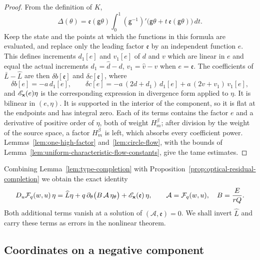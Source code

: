 \begin{proof}
From the definition of $K$,
\[
 \Delta(\theta)=\mathfrak e(\mathsf g\theta)
 \int_0^1(\mathsf g^{-1})'\bigl(\mathsf g\theta
          +t\,\mathfrak e(\mathsf g\theta)\bigr)\,dt .
\]
Keep the state and the points at which the functions in this formula
are evaluated, and replace only the leading factor $\mathfrak e$ by an
independent function $e$. This defines increments $d_1[e]$ and
$v_1[e]$ of $d$ and $v$ which are linear in $e$ and equal the actual
increments $d_1=\widehat d-d$, $v_1=\widehat v-v$ when
$e=\mathfrak e$. The coefficients of $\bar L-\widehat L$ are then
$\delta b[\mathfrak e]$ and $\delta c[\mathfrak e]$, where
\[
 \delta b[e]=-a\,d_1[e],\qquad
 \delta c[e]=-a\,(2d+d_1)\,d_1[e]+a\,(2v+v_1)\,v_1[e] ,
\]
and $\mathscr E_{\mathbf x}(e)\eta$ is the corresponding expression in
divergence form applied to $\eta$. It is bilinear in $(e,\eta)$. It
is supported in the interior of the component, so it is flat at the
endpoints and has integral zero. Each of its terms contains the
factor $e$ and a derivative of positive order of $\eta$, both of
weight $H_m^\beta$; after division by the weight of the source space,
a factor $H_m^\beta$ is left, which absorbs every coefficient power.
Lemmas~\ref{lem:one-high-factor} and~\ref{lem:circle-flow}, with
the bounds of
Lemma~\ref{lem:uniform-characteristic-flow-constants}, give the tame
estimates.
\end{proof}

Combining Lemma~\ref{lem:type-completion} with
Proposition~\ref{prop:optical-residual-completion} we obtain the exact
identity
\begin{equation}\label{eq:readable-completed-height-derivative}
 D_u\mathcal F_q(w,u)\,\eta=\widehat L\eta
       +q\,\partial_\theta\bigl(B\,\mathcal A\,\eta_\theta\bigr)
       +\mathscr E_{\mathbf x}(\mathfrak e)\,\eta,
 \qquad \mathcal A=\mathcal F_q(w,u),\quad B=\frac{E}{rQ}.
\end{equation}
Both additional terms vanish at a solution of
$(\mathcal A,\mathfrak e)=0$. We shall invert $\widehat L$ and carry
these terms as errors in the nonlinear theorem.

\subsection{Coordinates on a negative component}
\label{subsec:root-coordinate}


